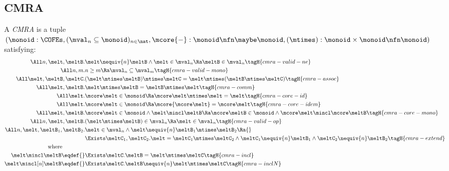 \subsection{CMRA}

\begin{defn}
  A \emph{CMRA} is a tuple $(\monoid : \COFEs, (\mval_n \subseteq \monoid)_{n \in \nat},\\ \mcore{{-}}: \monoid \nfn \maybe\monoid, (\mtimes) : \monoid \times \monoid \nfn \monoid)$ satisfying:
  \begin{align*}
    \All n, \melt, \meltB.& \melt \nequiv{n} \meltB \land \melt\in\mval_n \Ra \meltB\in\mval_n \tagH{cmra-valid-ne} \\
    \All n, m.& n \geq m \Ra \mval_n \subseteq \mval_m \tagH{cmra-valid-mono} \\
    \All \melt, \meltB, \meltC.& (\melt \mtimes \meltB) \mtimes \meltC = \melt \mtimes (\meltB \mtimes \meltC) \tagH{cmra-assoc} \\
    \All \melt, \meltB.& \melt \mtimes \meltB = \meltB \mtimes \melt \tagH{cmra-comm} \\
    \All \melt.& \mcore\melt \in \monoid \Ra \mcore\melt \mtimes \melt = \melt \tagH{cmra-core-id} \\
    \All \melt.& \mcore\melt \in \monoid \Ra \mcore{\mcore\melt} = \mcore\melt \tagH{cmra-core-idem} \\
    \All \melt, \meltB.& \mcore\melt \in \monoid \land \melt \mincl \meltB \Ra \mcore\meltB \in \monoid \land \mcore\melt \mincl \mcore\meltB \tagH{cmra-core-mono} \\
    \All n, \melt, \meltB.& (\melt \mtimes \meltB) \in \mval_n \Ra \melt \in \mval_n \tagH{cmra-valid-op} \\
    \All n, \melt, \meltB_1, \meltB_2.& \omit\rlap{$\melt \in \mval_n \land \melt \nequiv{n} \meltB_1 \mtimes \meltB_2 \Ra {}$} \\
    &\Exists \meltC_1, \meltC_2. \melt = \meltC_1 \mtimes \meltC_2 \land \meltC_1 \nequiv{n} \meltB_1 \land \meltC_2 \nequiv{n} \meltB_2 \tagH{cmra-extend} \\
    \text{where}\qquad\qquad\\
    \melt \mincl \meltB \eqdef{}& \Exists \meltC. \meltB = \melt \mtimes \meltC \tagH{cmra-incl} \\
    \melt \mincl[n] \meltB \eqdef{}& \Exists \meltC. \meltB \nequiv{n} \melt \mtimes \meltC \tagH{cmra-inclN}
  \end{align*}
\end{defn}


